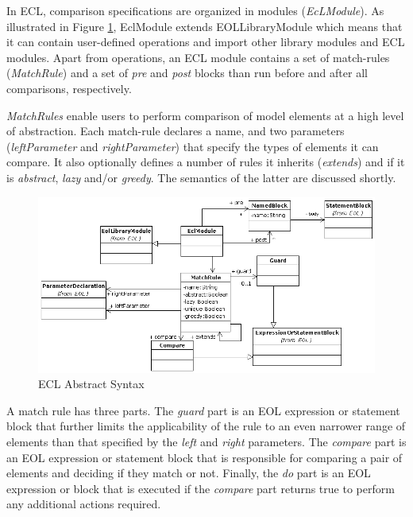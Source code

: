 In ECL, comparison specifications are organized in modules (\emph{EcLModule}). As illustrated in Figure \ref{fig:ECL}, EclModule extends EOLLibraryModule which means that it can contain user-defined operations and import other library modules and ECL modules. Apart from operations, an ECL module contains a set of match-rules (\emph{MatchRule}) and a set of \emph{pre} and \emph{post} blocks than run before and after all comparisons, respectively.

\emph{MatchRules} enable users to perform comparison of model elements at a high level of abstraction. Each match-rule declares a name, and two parameters (\emph{leftParameter} and \emph{rightParameter}) that specify the types of elements it can compare. It also optionally defines a number of rules it inherits (\emph{extends}) and if it is \emph{abstract}, \emph{lazy} and/or \emph{greedy}. The semantics of the latter are discussed shortly.

\begin{landscape}
\begin{figure}
	\centering
		\includegraphics{images/EclAbstractSyntax.png}
	\caption{ECL Abstract Syntax}
	\label{fig:ECL}
\end{figure}
\end{landscape}

A match rule has three parts. The \emph{guard} part is an EOL expression or statement block that further limits the applicability of the rule to an even narrower range of elements than that specified by the \emph{left} and \emph{right} parameters. The \emph{compare} part is an EOL expression or statement block that is responsible for comparing a pair of elements and deciding if they match or not. Finally, the \emph{do} part is an EOL expression or block that is executed if the \emph{compare} part returns true to perform any additional actions required.

